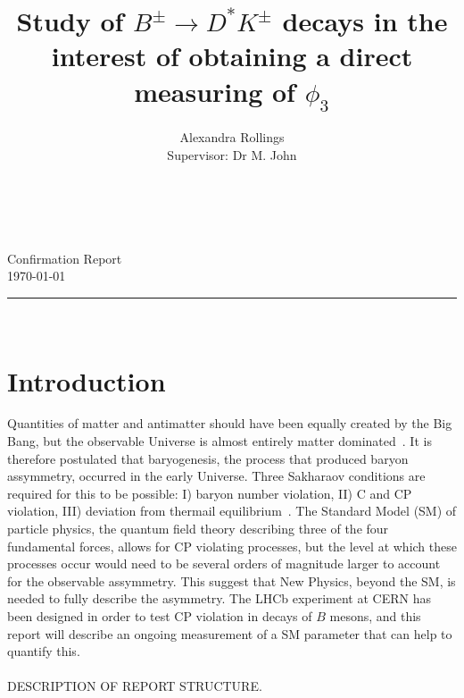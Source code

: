 \documentclass[oneside,12pt]{article}
\title{
      \LARGE \textbf{Study of $B^{\pm} \rightarrow D^{*}K^{\pm}$ decays in the interest of obtaining a direct measuring of $\phi_3$} \\
		}
\author{
		Alexandra Rollings\\	
		Supervisor: Dr M. John\\	
}
\makeatletter
\newcommand{\HRule}[1]{\rule{\linewidth}{#1}}     %
\def\printtitle{%
  {\centering \@title\par}}
\def\printauthor{%
  {\centering \large \@author}}
\makeatother
\begin{document}
\begin{titlepage}
\thispagestyle{empty} 
\begin{flushright}
\normalsize {Confirmation Report} 	%
\\ \normalsize \today			%
\end{flushright}
\HRule{0.5pt} \\						%
[2.0cm]
\printtitle 
\vspace{75pt}
\printauthor
\vfill
\begin{abstract}
\noindent
\\
\end{abstract}
\vfill
\end{titlepage}
\setcounter{page}{1}
\section{\normalsize Introduction}
Quantities of matter and antimatter should have been equally created by the Big Bang, but the observable Universe is almost entirely matter dominated~\cite{UniAsymmetry}. It is therefore postulated that baryogenesis, the process that produced baryon assymmetry, occurred in the early Universe. Three Sakharaov conditions are required for this to be possible: I) baryon number violation, II) C and CP violation, III) deviation from thermail equilibrium~\cite{Sakharov}. The Standard Model (SM) of particle physics, the quantum field
theory describing three of the four fundamental forces, allows for CP violating processes, but the level at which these processes occur would need to be several orders of magnitude larger to account for the observable assymmetry. This suggest that New Physics,
beyond the SM, is needed to fully describe the asymmetry. The LHCb experiment at CERN has been designed in order to test CP violation in decays of $B$ mesons, and this report will describe an ongoing measurement of a SM parameter that can help to quantify this. \\ 
\\
DESCRIPTION OF REPORT STRUCTURE.
\end{document}
